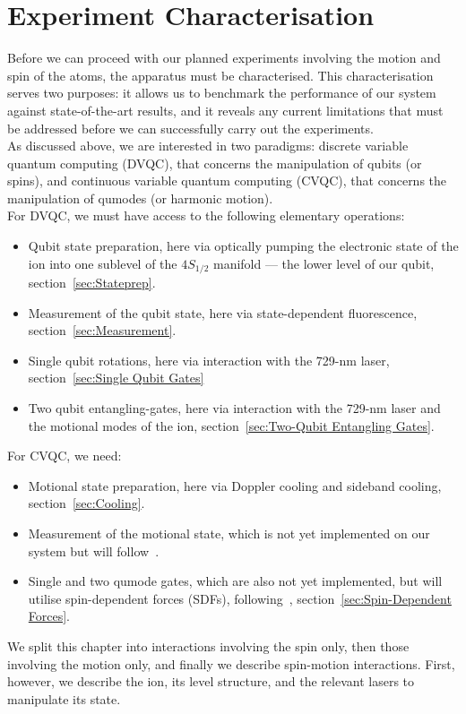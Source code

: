 \chapter{Experiment Characterisation}
\label{ch:Characterisation}
\minitoc

    Before we can proceed with our planned experiments involving the motion and
    spin of the atoms, the apparatus must be characterised. This characterisation
    serves two purposes: it allows us to benchmark the performance of our system
    against state-of-the-art results, and it reveals any current limitations
    that must be addressed before we can successfully carry out the experiments.\\
    As discussed above, we are interested in two paradigms: discrete variable quantum computing (DVQC), that concerns the manipulation of qubits (or spins), and continuous variable quantum computing (CVQC), that concerns the manipulation of qumodes (or harmonic motion).\\
    For DVQC, we must have access to the following elementary operations:
    \begin{itemize}
        \item Qubit state preparation, here via optically pumping the electronic state of the ion into one sublevel of the $4S_{1/2}$ manifold --- the lower level of our qubit, section~\ref{sec:Stateprep}.
        \item Measurement of the qubit state, here via state-dependent fluorescence, section~\ref{sec:Measurement}.
        \item Single qubit rotations, here via interaction with the 729-nm laser, section~\ref{sec:Single Qubit Gates}
        \item Two qubit entangling-gates, here via interaction with the 729-nm laser and the motional modes of the ion, section~\ref{sec:Two-Qubit Entangling Gates}.
    \end{itemize}
     For CVQC, we need:
    \begin{itemize}
        \item Motional state preparation, here via Doppler cooling and sideband cooling, section~\ref{sec:Cooling}.
        \item Measurement of the motional state, which is not yet implemented on our system but will follow~\cite{fluhmann2020direct}.
        \item Single and two qumode gates, which are also not yet implemented, but will utilise spin-dependent forces (SDFs), following~\cite{sutherland2021universal}, section~\ref{sec:Spin-Dependent Forces}.
    \end{itemize}
    We split this chapter into interactions involving the spin only, then those involving the motion only, and finally we describe spin-motion interactions.
    First, however, we describe the ion, its level structure, and the relevant lasers to manipulate its state.



